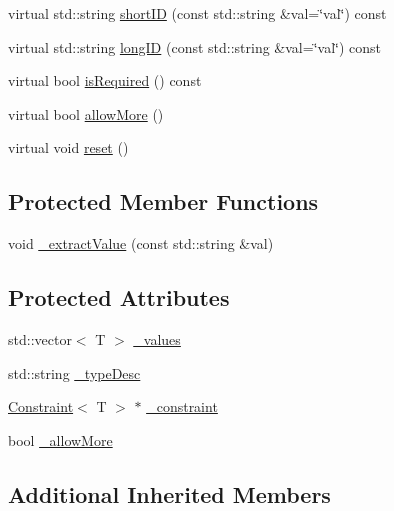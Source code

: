 \begin{DoxyCompactItemize}
virtual std\+::string \hyperlink{class_t_c_l_a_p_1_1_multi_arg_ac2c962112704b899f4c8b8565f2c4bb3}{short\+I\+D} (const std\+::string \&val=\char`\"{}val\char`\"{}) const 
\item 
virtual std\+::string \hyperlink{class_t_c_l_a_p_1_1_multi_arg_a16c00fbce6876bceabb3dab4723f7e79}{long\+I\+D} (const std\+::string \&val=\char`\"{}val\char`\"{}) const 
\item 
virtual bool \hyperlink{class_t_c_l_a_p_1_1_multi_arg_a3cb7fec92f3d70e0e455c6bc33fbebab}{is\+Required} () const 
\item 
virtual bool \hyperlink{class_t_c_l_a_p_1_1_multi_arg_ab05097627c81cd65975fa1b99fae9bd0}{allow\+More} ()
\item 
virtual void \hyperlink{class_t_c_l_a_p_1_1_multi_arg_ab21f01f22978a1c0eea716399e9ff89b}{reset} ()
\end{DoxyCompactItemize}
\subsection*{Protected Member Functions}
\begin{DoxyCompactItemize}
\item 
void \hyperlink{class_t_c_l_a_p_1_1_multi_arg_a26cbf5e86ac66d876f9285f1fda22470}{\+\_\+extract\+Value} (const std\+::string \&val)
\end{DoxyCompactItemize}
\subsection*{Protected Attributes}
\begin{DoxyCompactItemize}
\item 
std\+::vector$<$ T $>$ \hyperlink{class_t_c_l_a_p_1_1_multi_arg_aabcab153e09608343713a6ffef431783}{\+\_\+values}
\item 
std\+::string \hyperlink{class_t_c_l_a_p_1_1_multi_arg_a0f6a2b04fe15d1ede95165fc6e1949e8}{\+\_\+type\+Desc}
\item 
\hyperlink{class_t_c_l_a_p_1_1_constraint}{Constraint}$<$ T $>$ $\ast$ \hyperlink{class_t_c_l_a_p_1_1_multi_arg_afc754048b66bc3a251268947273ea906}{\+\_\+constraint}
\item 
bool \hyperlink{class_t_c_l_a_p_1_1_multi_arg_a93a3ef586f763d46839c0e737689b85f}{\+\_\+allow\+More}
\end{DoxyCompactItemize}
\subsection*{Additional Inherited Members}


